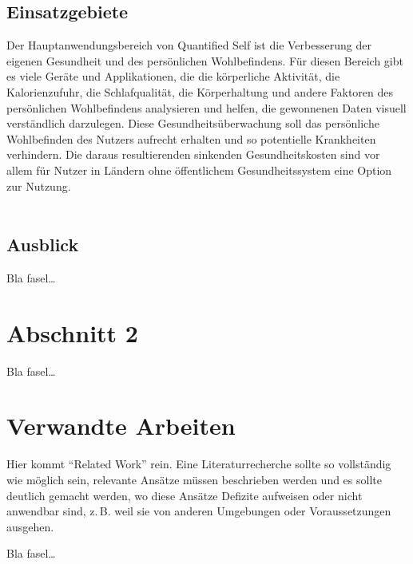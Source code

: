 \subsection{Einsatzgebiete}
\label{ch:Grundlagen:sec:Quantified Self:subsec:Einsatz}

Der Hauptanwendungsbereich von Quantified Self ist die Verbesserung der eigenen Gesundheit und des persönlichen Wohlbefindens. 
Für diesen Bereich gibt es viele Geräte und Applikationen, die die körperliche Aktivität, die Kalorienzufuhr, die Schlafqualität, die Körperhaltung und andere Faktoren des persönlichen Wohlbefindens analysieren und helfen, die gewonnenen Daten visuell verständlich darzulegen. 
Diese Gesundheitsüberwachung soll das persönliche Wohlbefinden des Nutzers aufrecht erhalten und so potentielle Krankheiten verhindern.
Die daraus resultierenden sinkenden Gesundheitskosten sind vor allem für Nutzer in Ländern ohne öffentlichem Gesundheitssystem eine Option zur Nutzung.
\\
\\

\subsection{Ausblick}
\label{ch:Grundlagen:sec:Quantified Self:subsec:Ausblick}

Bla fasel\ldots



\section{Abschnitt 2}
\label{ch:Grundlagen:sec:Abschnitt2}

Bla fasel\ldots

\section{Verwandte Arbeiten}
\label{ch:Grundlagen:sec:RelatedWork}
Hier kommt "`Related Work"' rein.
Eine Literaturrecherche sollte so vollständig wie möglich sein,
relevante Ansätze müssen beschrieben werden und es sollte deutlich 
gemacht werden, wo diese Ansätze Defizite aufweisen oder nicht
anwendbar sind, z.\,B. weil sie von anderen Umgebungen oder 
Voraussetzungen ausgehen.


Bla fasel\ldots

